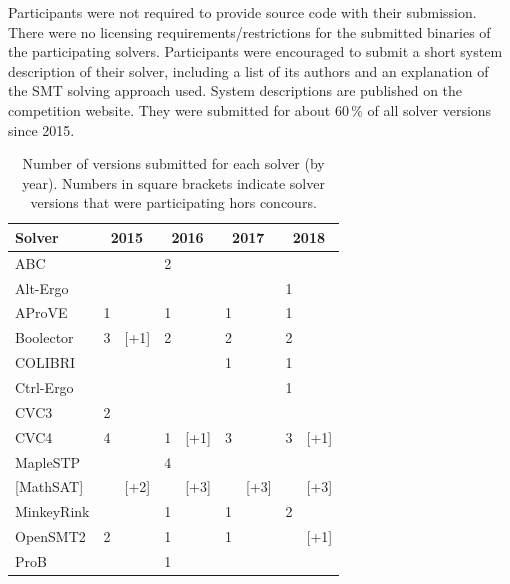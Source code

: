 \documentclass[dvipsnames,table,twoside,11pt]{article}
\begin{document}
Participants were not required to provide source code with their submission.
There were no licensing requirements/restrictions for the submitted binaries
of the participating solvers.
%
Participants were encouraged to submit a short system description
of their solver, including a list of its authors and an explanation of
the SMT solving approach used.  System descriptions are published on
the competition website.  They were submitted for about 60\,\% of all
solver versions since 2015.



\begin{table}
  \caption{Number of versions submitted for each solver (by year).
    Numbers in square brackets indicate solver versions that were
    participating hors concours.}
  \label{table:participants-history}
  \centering
  \begin{tabular}{lr@{\,\,}rr@{\,\,}rr@{\,\,}rr@{\,\,}r}
    \toprule
    Solver & \multicolumn{2}{c}{2015} & \multicolumn{2}{c}{2016} & \multicolumn{2}{c}{2017} & \multicolumn{2}{c}{2018} \\
    \midrule
    ABC               &    &      &  2 &      &    &      &    &      \\
    Alt-Ergo          &    &      &    &      &    &      &  1 &      \\
    AProVE            &  1 &      &  1 &      &  1 &      &  1 &      \\
    Boolector         &  3 & [+1] &  2 &      &  2 &      &  2 &      \\
    COLIBRI           &    &      &    &      &  1 &      &  1 &      \\
    Ctrl-Ergo         &    &      &    &      &    &      &  1 &      \\
    CVC3              &  2 &      &    &      &    &      &    &      \\
    CVC4              &  4 &      &  1 & [+1] &  3 &      &  3 & [+1] \\
    MapleSTP          &    &      &  4 &      &    &      &    &      \\
    {[}MathSAT{]}     &    & [+2] &    & [+3] &    & [+3] &    & [+3] \\
    MinkeyRink        &    &      &  1 &      &  1 &      &  2 &      \\
    OpenSMT2          &  2 &      &  1 &      &  1 &      &    & [+1] \\
    ProB              &    &      &  1 &      &    &      &    &      \\

\end{tabular}
\end{table}
\end{document}
